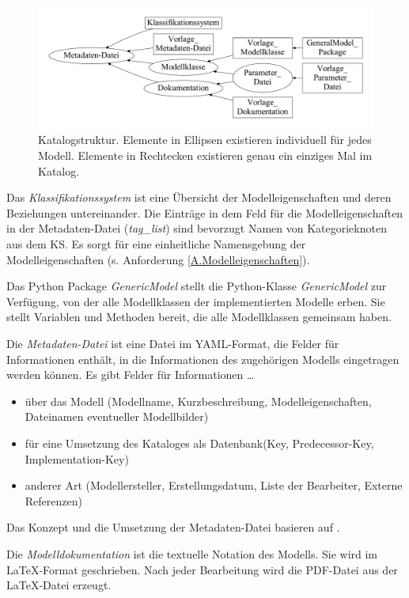 \begin{figure}[H]
	\centering
	\includegraphics[width=1\linewidth]{Katalogstruktur}
	\caption[Katalogstruktur]{Katalogstruktur. Elemente in Ellipsen existieren individuell für jedes Modell. Elemente in Rechtecken existieren genau ein einziges Mal im Katalog.}
	\label{fig:Katalogstruktur}
\end{figure}
%
Das \textit{Klassifikationssystem} ist eine Übersicht der Modelleigenschaften und deren Beziehungen untereinander. Die Einträge in dem Feld für die Modelleigenschaften in der Metadaten-Datei (\textit{tag\_list}) sind bevorzugt Namen von Kategorieknoten aus dem KS. Es sorgt für eine einheitliche Namensgebung der Modelleigenschaften (s. Anforderung \ref{A.Modelleigenschaften}). 

Das Python Package \textit{GenericModel} stellt die Python-Klasse \textit{GenericModel} zur Verfügung, von der alle Modellklassen der implementierten Modelle erben. Sie stellt Variablen und Methoden bereit, die alle Modellklassen gemeinsam haben.

Die \textit{Metadaten-Datei} ist eine Datei im YAML-Format, die Felder für Informationen enthält, in die Informationen des zugehörigen Modells eingetragen werden können. Es gibt Felder für Informationen \dots 
\begin{itemize}[label=$\bullet$]
	\item über das Modell (Modellname, Kurzbeschreibung, Modelleigenschaften, Dateinamen eventueller Modellbilder)
	\item für eine Umsetzung des Kataloges als Datenbank(Key, Predecessor-Key, Implementation-Key)
	\item anderer Art (Modellersteller, Erstellungsdatum, Liste der Bearbeiter, Externe Referenzen)
\end{itemize}
Das Konzept und die Umsetzung der Metadaten-Datei basieren auf \cite{KNHE20b}. 

Die \textit{Modelldokumentation} ist die textuelle Notation des Modells. Sie wird im \LaTeX-Format geschrieben. Nach jeder Bearbeitung wird die PDF-Datei aus der \LaTeX-Datei erzeugt. 

